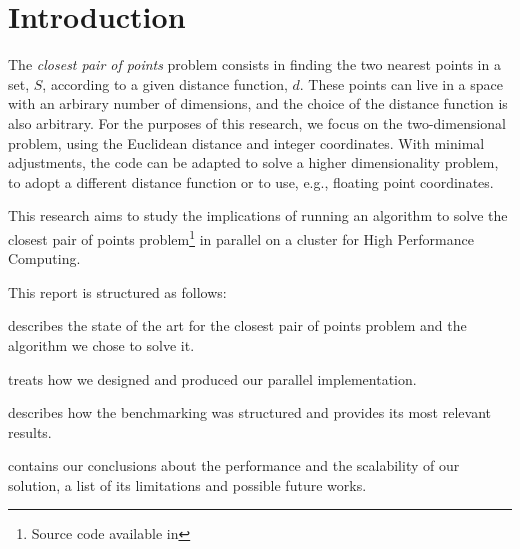 \section{Introduction}
\label{sec:introduction}

The \textit{closest pair of points} problem consists
in finding the two nearest points in a set, $S$, according to a given distance function, $d$\cite{closest_pair_definition}.
These points can live in a space with an arbirary number of dimensions,
and the choice of the distance function is also arbitrary.
For the purposes of this research, we focus on the two-dimensional problem, using the Euclidean distance and integer coordinates.
With minimal adjustments, the code can be adapted to solve a higher dimensionality problem, to adopt a different distance function or to use, e.g., floating point coordinates.

This research aims to study the implications of running an algorithm to solve the closest pair of points problem\footnote{Source code available in } in parallel on a cluster for High Performance Computing.

This report is structured as follows:
\begin{inlinelist}
    \item {} describes the state of the art for the closest pair of points problem and the algorithm we chose to solve it.
    \item {} treats how we designed and produced our parallel implementation.
    \item {} describes how the benchmarking was structured and
    provides its most relevant results.
    \item {} contains our conclusions about the performance and the scalability of our solution, a list of its limitations and possible future works.
\end{inlinelist}
